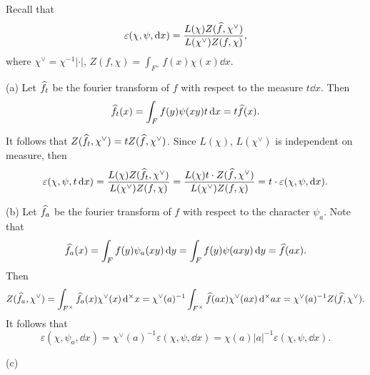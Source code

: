 \begin{solution}
  Recall that
  \[\varepsilon(\chi, \psi, \mathop{}\!\mathrm{d} x) =
    \frac{L(\chi)Z(\widehat{f}, \chi^\vee )}{L (\chi ^ \vee) Z(f, \chi)}, \]
  where $\chi^\vee = \chi^{-1}|\cdot|$, $Z(f, \chi) = \int_{F^\times} f(x) \chi(x) \dd x$.

  (a) Let $\widehat{f_t}$ be the fourier transform of $f$ with respect to the measure $t \dd x$.
  Then \[\widehat{f_t} (x) = \int_{F} f(y) \psi(x y) t \mathop{}\!\mathrm{d} x = t \widehat{f} (x). \]

  It follows that $Z(\widehat{f_t}, \chi^\vee) = t Z(\widehat{f}, \chi^\vee)$. Since $L(\chi)$,
  $L(\chi^\vee)$ is independent on measure, then
  \[\varepsilon (\chi, \psi, t \mathop{}\!\mathrm{d} x) =
  \frac{L(\chi)Z(\widehat{f_t}, \chi^\vee )}{L (\chi ^ \vee) Z(f, \chi)} =
  \frac{L(\chi)t \cdot Z(\widehat{f}, \chi^\vee)}{L(\chi^\vee) Z(f, \chi)} =
  t \cdot \varepsilon(\chi, \psi, \mathop{}\!\mathrm{d} x).  \]

  (b) Let $\widehat{f_a}$ be the fourier transform of $f$ with respect to the character $\psi_a$.
  Note that
  \[\widehat{f_a} (x) = \int_{F} f(y) \psi_a(x y) \mathop{}\!\mathrm{d} y = \int_{F} f(y) \psi(a x y) \mathop{}\!\mathrm{d} y
  = \widehat{f} (a x).  \]
  Then
  \[Z(\widehat{f_a}, \chi^\vee) = \int_{F^\times} \widehat{f_a} (x) \chi^\vee (x) \mathop{}\!\mathrm{d}^\times x =
  \chi^\vee(a) ^{-1} \int_{F^\times} \widehat{f} (a x)\chi^\vee(a x) \mathop{}\!\mathrm{d}^\times ax =
  \chi^\vee (a)^{-1} Z(\widehat{f}, \chi^\vee). \]
  It follows that
  \[\varepsilon (\chi, \psi_a, \dd x) = \chi^\vee(a)^{-1} \varepsilon(\chi, \psi, \dd x) =
  \chi(a) |a|^{-1} \varepsilon(\chi, \psi, \dd x).  \]

  (c)
\end{solution}

